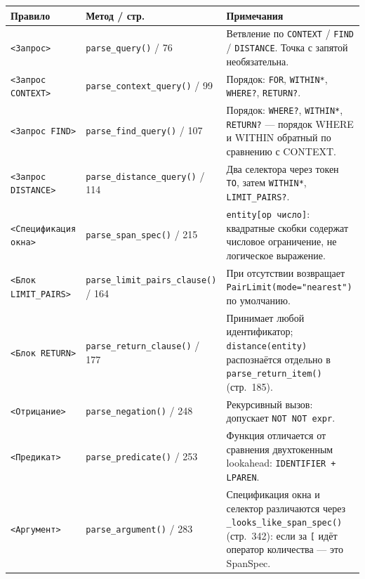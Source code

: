 \documentclass[a4paper,12pt]{article}
\begin{document}
\begin{table}[h!]
\centering
\small
\begin{tabularx}{\textwidth}{llX}
\toprule
\textbf{Правило}                & \textbf{Метод / стр.} & \textbf{Примечания} \\
\midrule
\texttt{<Запрос>}               & \texttt{parse\_query()} / 76                 & Ветвление по \texttt{CONTEXT} / \texttt{FIND} / \texttt{DISTANCE}. Точка с запятой необязательна. \\
\texttt{<Запрос CONTEXT>}       & \texttt{parse\_context\_query()} / 99        & Порядок: \texttt{FOR}, \texttt{WITHIN*}, \texttt{WHERE?}, \texttt{RETURN?}. \\
\texttt{<Запрос FIND>}          & \texttt{parse\_find\_query()} / 107          & Порядок: \texttt{WHERE?}, \texttt{WITHIN*}, \texttt{RETURN?} --- порядок WHERE и WITHIN обратный по сравнению с CONTEXT. \\
\texttt{<Запрос DISTANCE>}      & \texttt{parse\_distance\_query()} / 114      & Два селектора через токен \texttt{TO}, затем \texttt{WITHIN*}, \texttt{LIMIT\_PAIRS?}. \\
\texttt{<Спецификация окна>}    & \texttt{parse\_span\_spec()} / 215           & \texttt{entity[op число]}: квадратные скобки содержат числовое ограничение, не логическое выражение. \\
\texttt{<Блок LIMIT\_PAIRS>}    & \texttt{parse\_limit\_pairs\_clause()} / 164 & При отсутствии возвращает \texttt{PairLimit(mode="nearest")} по умолчанию. \\
\texttt{<Блок RETURN>}          & \texttt{parse\_return\_clause()} / 177       & Принимает любой идентификатор; \texttt{distance(entity)} распознаётся отдельно в \texttt{parse\_return\_item()} (стр.~185). \\
\texttt{<Отрицание>}            & \texttt{parse\_negation()} / 248             & Рекурсивный вызов: допускает \texttt{NOT NOT expr}. \\
\texttt{<Предикат>}             & \texttt{parse\_predicate()} / 253            & Функция отличается от сравнения двухтокенным lookahead: \texttt{IDENTIFIER + LPAREN}. \\
\texttt{<Аргумент>}             & \texttt{parse\_argument()} / 283             & Спецификация окна и селектор различаются через \texttt{\_looks\_like\_span\_spec()} (стр.~342): если за \texttt{[} идёт оператор количества --- это SpanSpec. \\
\bottomrule
\end{tabularx}
\end{table}
\end{document}
